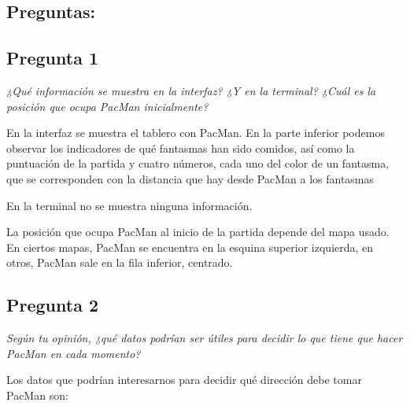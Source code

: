 \documentclass[12pt]{article}
\begin{document}
\tableofcontents

\newpage

\begin{center}
\section{Preguntas:}

\subsection{Pregunta 1}

\emph{¿Qué información se muestra en la interfaz? ¿Y en la terminal? ¿Cuál es la
posición que ocupa PacMan inicialmente?}\\
\end{center}

En la interfaz se muestra el tablero con PacMan. En la parte inferior podemos
observar los indicadores de qué fantasmas han sido comidos, así como la
puntuación de la partida y cuatro números, cada uno del color de un fantasma,
que se corresponden con la distancia que hay desde PacMan a los fantasmas

En la terminal no se muestra ninguna información.

La posición que ocupa PacMan al inicio de la partida depende del mapa usado. En
ciertos mapas, PacMan se encuentra en la esquina superior izquierda, en otros,
PacMan sale en la fila inferior, centrado.


\newpage
\begin{center}
\subsection{Pregunta 2}

\emph{Según tu opinión, ¿qué datos podrían ser útiles para decidir lo que tiene
que hacer PacMan en cada momento?}
\end{center}

Los datos que podrían interesarnos para decidir qué dirección debe tomar
PacMan son:
\end{document}
